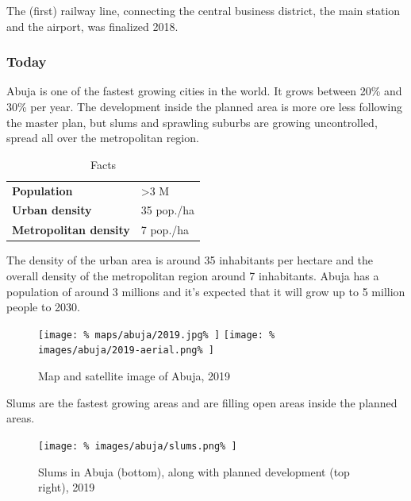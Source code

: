 \documentclass[twocolumn]{article}
\begin{document}
			The (first) railway line, connecting the central business district, the main station and the airport, was finalized 2018.
			
			
			\subsubsection{Today}
			
			Abuja is one of the fastest growing cities in the world. It grows between 20\% and 30\% per year. The development inside the planned area is more ore less following the master plan, but slums and sprawling suburbs are growing uncontrolled, spread all over the metropolitan region.
			
			\begin{table}[H]			
				\centering
				\caption{Facts}
				\label{table:abuja-facts}
				\begin{tabular}{|l|l|}
					\hline
					\textbf{Population}           & \textgreater 3 M \\
					\textbf{Urban density}        & 35 pop./ha \\
					\textbf{Metropolitan density} & 7 pop./ha \\
					\hline
				\end{tabular}
			\end{table}
			
			The density of the urban area is around 35 inhabitants per hectare and the overall density of the metropolitan region around 7 inhabitants.
			Abuja has a population of around 3 millions and it's expected that it will grow up to 5 million people to 2030.
			
			\begin{figure}[H]			
				\texttt{[image: \%
					maps/abuja/2019.jpg\%
				]}
				\texttt{[image: \%
					images/abuja/2019-aerial.png\%
				]}
				\caption{Map\cite{OpenStreetMap:Abuja} and satellite image\cite{Satellites.pro:Abuja} of Abuja, 2019}
				\label{fig:map:abuja-map-satellite-2019}
			\end{figure}
			
			Slums are the fastest growing areas and are  filling open areas inside the planned areas.
			
			\begin{figure}[H]
				\texttt{[image: \%
					images/abuja/slums.png\%
				]}
				\caption{Slums in Abuja (bottom), along with planned development (top right), 2019\cite{Satellites.pro:Abuja}}
				\label{fig:images:abuja-slums}
			\end{figure}
			
\end{document}
